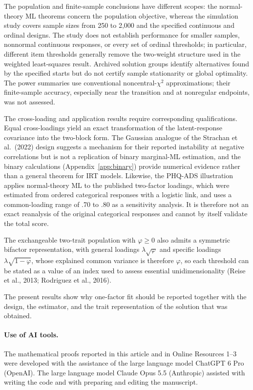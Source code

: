 The population and finite-sample conclusions have different scopes: the normal-theory ML theorems concern the population objective, whereas the simulation study covers sample sizes from 250 to 2,000 and the specified continuous and ordinal designs. The study does not establish performance for smaller samples, nonnormal continuous responses, or every set of ordinal thresholds; in particular, different item thresholds generally remove the two-weight structure used in the weighted least-squares result. Archived solution groups identify alternatives found by the specified starts but do not certify sample stationarity or global optimality. The power summaries use conventional noncentral-$\chi^2$ approximations; their finite-sample accuracy, especially near the transition and at nonregular endpoints, was not assessed.

The cross-loading and application results require corresponding qualifications. Equal cross-loadings yield an exact transformation of the latent-response covariance into the two-block form. The Gaussian analogue of the Strachan et al.\ (2022) design suggests a mechanism for their reported instability at negative correlations but is not a replication of binary marginal-ML estimation, and the binary calculations (Appendix~\ref{app:binary}) provide numerical evidence rather than a general theorem for IRT models. Likewise, the PHQ-ADS illustration applies normal-theory ML to the published two-factor loadings, which were estimated from ordered categorical responses with a logistic link, and uses a common-loading range of .70 to .80 as a sensitivity analysis. It is therefore not an exact reanalysis of the original categorical responses and cannot by itself validate the total score.

The exchangeable two-trait population with $\varphi\ge0$ also admits a symmetric bifactor representation, with general loadings $\lambda\sqrt{\varphi}$ and specific loadings $\lambda\sqrt{1-\varphi}$, whose explained common variance is therefore $\varphi$, so each threshold can be stated as a value of an index used to assess essential unidimensionality (Reise et al., 2013; Rodriguez et al., 2016).

The present results show why one-factor fit should be reported together with the design, the estimator, and the trait representation of the solution that was obtained.

\ifdefined\preprint\else
\paragraph{Use of AI tools.}
The mathematical proofs reported in this article and in Online Resources 1--3 were developed with the assistance of the large language model ChatGPT 6 Pro (OpenAI). The large language model Claude Opus 5.5 (Anthropic) assisted with writing the code and with preparing and editing the manuscript.
\fi
